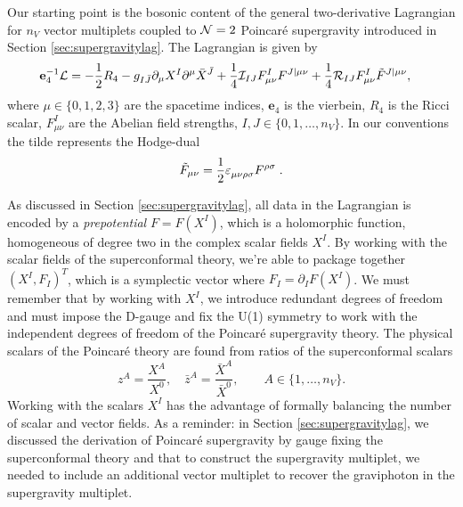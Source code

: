 Our starting point is the bosonic content of the general two-derivative Lagrangian for $n_V$ vector multiplets coupled to ${\cal N}=2$ Poincar\'e supergravity introduced in Section \ref{sec:supergravitylag}. The Lagrangian is given by 
\begin{equation}
\label{eq:4dlag}
\begin{aligned}
     \mathbf{e}_4^{-1} {\cal L} &= - \frac{1}{2}R_4 - g_{I\bar{J}} \partial_\mu X^I \partial^\mu \bar{X}^{\bar{J}} + \frac{1}{4} {\cal I}_{IJ} F^I_{\mu \nu} F^{J|\mu \nu} + \frac{1}{4} {\cal R}_{IJ} F^I_{\mu \nu} \tilde{F}^{J|\mu \nu},
\end{aligned}
\end{equation}
where $\mu \in \{0,1,2,3 \}$ are the spacetime indices, $\mathbf{e}_4$ is the vierbein, $R_4$ is the Ricci scalar, $F_{\mu \nu}^I $ are the Abelian field strengths, $I,J \in \{ 0,1,\ldots, n_V \}$. In our conventions the tilde represents the Hodge-dual
\begin{equation}
\tilde{F}_{\mu \nu} = \frac{1}{2} \tensor{\varepsilon}{_{\mu \nu \rho \sigma}} F^{\rho \sigma} \;.
\end{equation}

As discussed in Section \ref{sec:supergravitylag}, all data in the Lagrangian is encoded by a {\em prepotential} $F=F(X^I)$, which is a holomorphic function, homogeneous of degree two in the complex scalar fields $X^I$. By working with the scalar fields of the superconformal theory, we're able to package together $(X^I, F_I)^T$, which is a symplectic vector where $F_I = \partial_I F(X^I)$. We must remember that by working with $X^I$, we introduce redundant degrees of freedom and must impose the D-gauge and fix the U(1) symmetry to work with the independent degrees of freedom of the Poincar\'e supergravity theory. The physical scalars of the Poincar\'e theory are found from ratios of the superconformal scalars 
\begin{equation}
\label{eq:physicalscalarshere}
 z^A = \frac{X^A}{X^0}, \quad \bar{z}^A = \frac{\bar{X}^A}{\bar{X}^0}, \qquad A \in \{ 1, \ldots, n_V \}.
\end{equation}
Working with the scalars $X^I$ has the advantage of formally balancing the number of scalar and vector fields. As a reminder: in Section \ref{sec:supergravitylag}, we discussed the derivation of Poincar\'e supergravity by gauge fixing the superconformal theory and that to construct the supergravity multiplet, we needed to include an additional vector multiplet to recover the graviphoton in the supergravity multiplet. 

